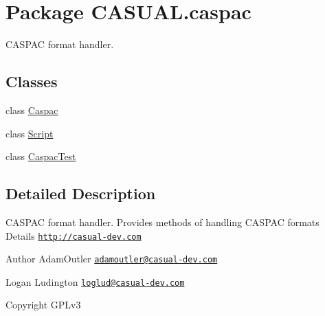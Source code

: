 \hypertarget{namespace_c_a_s_u_a_l_1_1caspac}{\section{Package C\-A\-S\-U\-A\-L.\-caspac}
\label{namespace_c_a_s_u_a_l_1_1caspac}
}


C\-A\-S\-P\-A\-C format handler.  


\subsection*{Classes}
\begin{DoxyCompactItemize}
\item 
class \hyperlink{class_c_a_s_u_a_l_1_1caspac_1_1_caspac}{Caspac}
\item 
class \hyperlink{class_c_a_s_u_a_l_1_1caspac_1_1_script}{Script}
\item 
class \hyperlink{class_c_a_s_u_a_l_1_1caspac_1_1_caspac_test}{Caspac\-Test}
\end{DoxyCompactItemize}


\subsection{Detailed Description}
C\-A\-S\-P\-A\-C format handler. Provides methods of handling C\-A\-S\-P\-A\-C formats Details \href{http://casual-dev.com}{\tt http\-://casual-\/dev.\-com} \begin{DoxyAuthor}{Author}
Adam\-Outler \href{mailto:adamoutler@casual-dev.com}{\tt adamoutler@casual-\/dev.\-com} 

Logan Ludington \href{mailto:loglud@casual-dev.com}{\tt loglud@casual-\/dev.\-com} 
\end{DoxyAuthor}
\begin{DoxyCopyright}{Copyright}
G\-P\-Lv3 
\end{DoxyCopyright}
